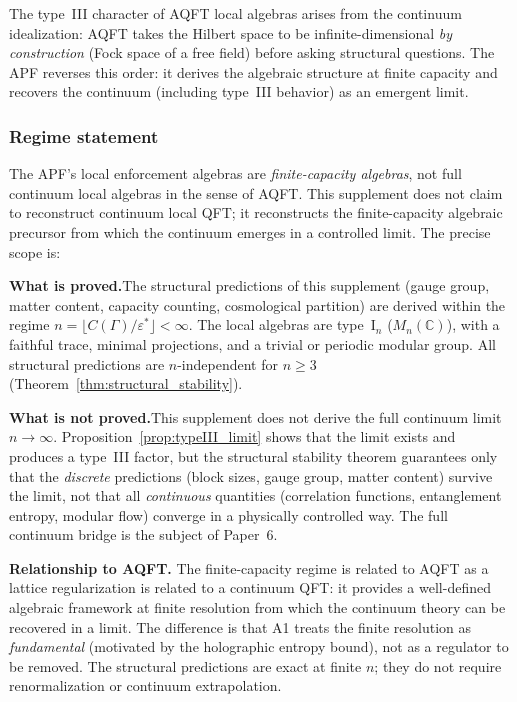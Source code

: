 \documentclass[11pt,a4paper]{article}
\theoremstyle{definition}
\begin{document}
The type~III character of AQFT local algebras arises from the
continuum idealization: AQFT takes the Hilbert space to be
infinite-dimensional \emph{by construction} (Fock space of a free
field) before asking structural questions.  The APF reverses this
order: it derives the algebraic structure at finite capacity and
recovers the continuum (including type~III behavior) as an emergent
limit.


\subsubsection{Regime statement}
\label{sec:regime_statement}

The APF's local enforcement algebras are \emph{finite-capacity
algebras}, not full continuum local algebras in the sense of AQFT.
This supplement does not claim to reconstruct continuum local QFT;
it reconstructs the finite-capacity algebraic precursor from which
the continuum emerges in a controlled limit.  The precise scope is:

\begin{tcolorbox}[apfbox, title={Regime: finite-capacity enforcement algebras}]
\textbf{What is proved.}\quad The structural predictions of this
supplement (gauge group, matter content, capacity counting,
cosmological partition) are derived within the regime
$n = \lfloor C(\Gamma) / \varepsilon^* \rfloor < \infty$.  The
local algebras are type~I$_n$ ($M_n(\mathbb{C})$), with a faithful
trace, minimal projections, and a trivial or periodic modular group.
All structural predictions are $n$-independent for $n \ge 3$
(Theorem~\ref{thm:structural_stability}).

\smallskip\noindent\textbf{What is not proved.}\quad This supplement
does not derive the full continuum limit $n \to \infty$.
Proposition~\ref{prop:typeIII_limit} shows that the limit exists and
produces a type~III factor, but the structural stability theorem
guarantees only that the \emph{discrete} predictions (block sizes,
gauge group, matter content) survive the limit, not that all
\emph{continuous} quantities (correlation functions, entanglement
entropy, modular flow) converge in a physically controlled way.  The
full continuum bridge is the subject of Paper~6.

\smallskip\noindent\textbf{Relationship to AQFT.}\quad
The finite-capacity regime is related to AQFT as a lattice
regularization is related to a continuum QFT: it provides a
well-defined algebraic framework at finite resolution from which the
continuum theory can be recovered in a limit.  The difference is that
A1 treats the finite resolution as \emph{fundamental} (motivated by
the holographic entropy bound), not as a regulator to be removed.  The
structural predictions are exact at finite $n$; they do not require
renormalization or continuum extrapolation.
\end{tcolorbox}
\end{document}
